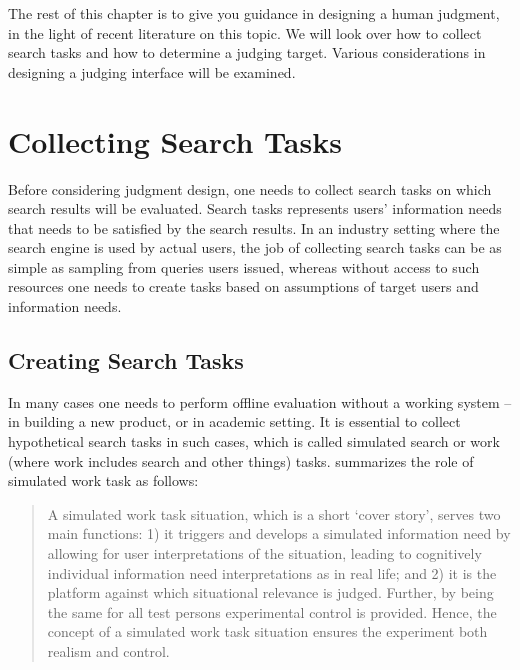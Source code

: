 \documentclass[openany]{now} %
\begin{document}
The rest of this chapter is to give you guidance in designing a human judgment, in the light of recent literature on this topic. We will look over how to collect search tasks and how to determine a judging target. Various considerations in designing a judging interface will be examined. %



\section{Collecting Search Tasks}
Before considering judgment design, one needs to collect search tasks on which search results will be evaluated. Search tasks represents users' information needs that needs to be satisfied by the search results. In an industry setting where the search engine is used by actual users, the job of collecting search tasks can be as simple as sampling from queries users issued, whereas without access to such resources one needs to create tasks based on assumptions of target users and information needs. 

\subsection{Creating Search Tasks}
In many cases one needs to perform offline evaluation without a working system -- in building a new product, or in academic setting. It is essential to collect hypothetical search tasks in such cases, which is called simulated search or work (where work includes search and other things) tasks. \cite{Borlund:2003} summarizes the role of  simulated work task as follows:


\begin{quote}
A simulated work task situation, which is a short `cover story', serves two main functions: 1) it triggers and develops a simulated information need by allowing for user interpretations of the situation, leading to cognitively individual information need interpretations as in real life; and 2) it is the platform against which situational relevance is judged. Further, by being the same for all test persons experimental control is provided. Hence, the concept of a simulated work task situation ensures the experiment both realism and control.	
\end{quote}
\end{document}
